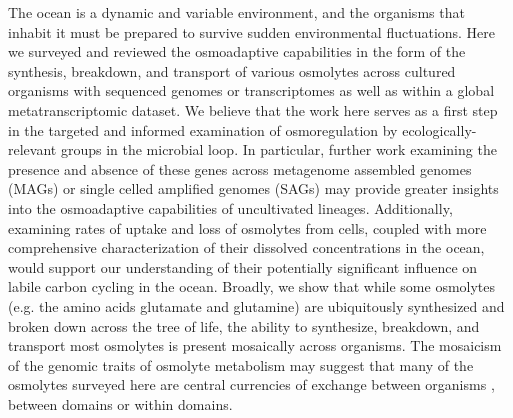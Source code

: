 \documentclass[utf8]{frontiersSCNS} %
\begin{document}
The ocean is a dynamic and variable environment, and the organisms that inhabit it must be prepared to survive sudden environmental fluctuations. Here we surveyed and reviewed the osmoadaptive capabilities in the form of the synthesis, breakdown, and transport of various osmolytes across cultured organisms with sequenced genomes or transcriptomes as well as within a global metatranscriptomic dataset. We believe that the work here serves as a first step in the targeted and informed examination of osmoregulation by ecologically-relevant groups in the microbial loop. In particular, further work examining the presence and absence of these genes across metagenome assembled genomes (MAGs) or single celled amplified genomes (SAGs) may provide greater insights into the osmoadaptive capabilities of uncultivated lineages. Additionally, examining rates of uptake and loss of osmolytes from cells, coupled with more comprehensive characterization of their dissolved concentrations in the ocean, would support our understanding of their potentially significant influence on labile carbon cycling in the ocean. Broadly, we show that while some osmolytes (e.g. the amino acids glutamate and glutamine) are ubiquitously synthesized and broken down across the tree of life, the ability to synthesize, breakdown, and transport most osmolytes is present mosaically across organisms. The mosaicism of the genomic traits of osmolyte metabolism may suggest that many of the osmolytes surveyed here are central currencies of exchange between organisms \citep{Moran2016}, between domains or within domains. 
\end{document}
